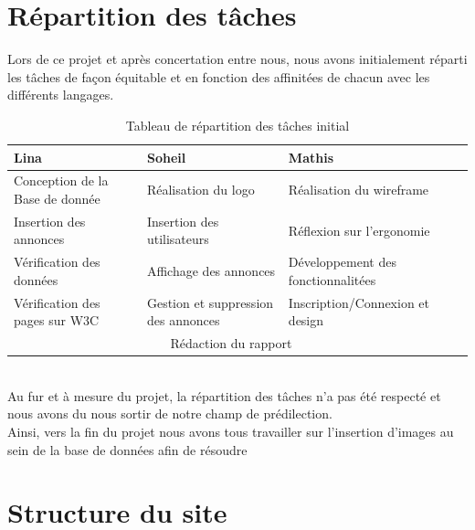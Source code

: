 \documentclass[11pt,a4paper]{article}
\begin{document}
\section{Répartition des tâches}
Lors de ce projet et après concertation entre nous, nous avons initialement réparti les tâches de façon équitable et en fonction des affinitées de chacun avec les différents langages.
\begin{table}[h]
    \begin{center}
        \begin{tabularx}{16.3cm}{|p{5cm}|p{5cm}|p{5cm}|X|}
            \hline
            Lina & Soheil & Mathis \\
            \hline
            Conception de la Base de donnée & Réalisation du logo & Réalisation du wireframe \\
            Insertion des annonces & Insertion des utilisateurs & Réflexion sur l'ergonomie \\
            Vérification des données & Affichage des annonces & Développement des fonctionnalitées \\
            Vérification des pages sur W3C & Gestion et suppression des annonces & Inscription/Connexion et design \\
            \hline
            \multicolumn{3}{|c|}{Rédaction du rapport} \\
        \hline
        \end{tabularx}
        \caption{Tableau de répartition des tâches initial}
    \end{center}
\end{table}
\\Au fur et à mesure du projet, la répartition des tâches n'a pas été respecté et nous avons du nous sortir de notre champ de prédilection.\\
Ainsi, vers la fin du projet nous avons tous travailler sur l'insertion d'images au sein de la base de données afin de résoudre 
\section{Structure du site}
\end{document}

